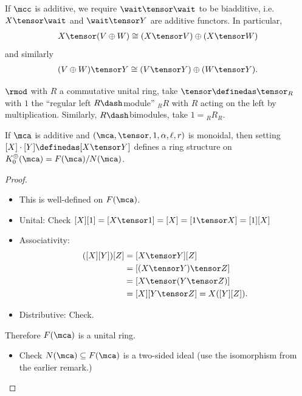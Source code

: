 \begin{remark}

If \(\mcc\) is additive, we require \(\wait \tensor \wait\) to be
biadditive, i.e.~\(X\tensor \wait\) and \(\wait \tensor Y\) are additive
functors. In particular,
\begin{align*}
X\tensor (V\oplus W) \cong (X\tensor V) \oplus (X\tensor W)
\end{align*} and similarly
\begin{align*} 
(V\oplus W) \tensor Y \cong (V\tensor Y) \oplus (W\tensor Y)
.\end{align*}

\end{remark}

\begin{example}

\(\rmod\) with \(R\) a commutative unital ring, take
\(\tensor \definedas \tensor_R\) with \(1\) the ``regular left
\(R\dash\)module'' \({}_R R\) with \(R\) acting on the left by
multiplication. Similarly, \(R\dash\)bimodules, take \(1 = {}_R R_R\).

\end{example}

\begin{proposition}[?]

If \(\mca\) is additive and \((\mca, \tensor, 1, \alpha, \ell, r)\) is
monoidal, then setting \([X] \cdot [Y] \definedas [X\tensor Y]\) defines
a ring structure on \(K_0^\oplus(\mca) = F(\mca) / N(\mca)\).

\end{proposition}

\begin{proof}

\hfill

\begin{itemize}
\tightlist
\item
  This is well-defined on \(F(\mca)\).
\item
  Unital: Check \([X][1] = [X\tensor 1] = [X] = [1\tensor X] = [1][X]\)
\item
  Associativity:
  \begin{align*}
  ([X][Y])[Z] 
  &= [X\tensor Y][Z] \\
  &= [(X\tensor Y) \tensor Z]  \\
  &= [X\tensor (Y\tensor Z)]  \\
  &= [X][Y\tensor Z] = X([Y][Z])
  .\end{align*}
\item
  Distributive: Check.
\end{itemize}

Therefore \(F(\mca)\) is a unital ring.

\begin{itemize}
\tightlist
\item
  Check \(N(\mca) \subseteq F(\mca)\) is a two-sided ideal (use the
  isomorphism from the earlier remark.)
\end{itemize}

\end{proof}


